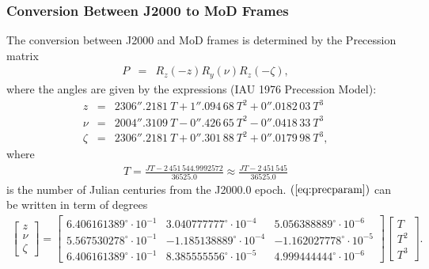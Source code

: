 \documentclass [12pt, a4paper] {article}
\begin{document}
\subsubsection{Conversion Between J2000 to MoD Frames}
The conversion between J2000 and MoD frames is determined by the Precession matrix
\begin {eqnarray}
  P &=& R_z(-z)R_y(\nu)R_z(-\zeta),
\end {eqnarray}
where the angles are given by the expressions (IAU 1976 Precession Model):
\begin {eqnarray}
  \label{eq:precparam}
  z     &=& 2306''.2181\:T + 1''.094\,68\:T^2 + 0''.0182\,03\:T^3 \\\nonumber
  \nu   &=& 2004''.3109\:T - 0''.426\,65\:T^2 - 0''.0418\,33\:T^3 \\\nonumber
  \zeta &=& 2306''.2181\:T + 0''.301\,88\:T^2 + 0''.0179\,98\:T^3,
\end {eqnarray}
where
\begin {eqnarray}
  T= \frac{JT - 2\,451\,544.9992572}{36525.0} \approx 
  \frac{JT - 2\,451\,545}{36525.0}
\end {eqnarray} 
is the number of Julian centuries from the J2000.0 epoch.
$(\ref{eq:precparam})$ can be written in term of degrees
\begin {eqnarray}
  \begin {bmatrix}
    z\\\nu\\\zeta
  \end {bmatrix}
  =
  \begin {bmatrix}
    6.406161389^\circ\cdot 10^{-1} &  3.040777777^\circ\cdot 10^{-4} &  5.056388889^\circ\cdot 10^{-6} \\
    5.567530278^\circ\cdot 10^{-1} & -1.185138889^\circ\cdot 10^{-4} & -1.162027778^\circ\cdot 10^{-5} \\
    6.406161389^\circ\cdot 10^{-1} &  8.385555556^\circ\cdot 10^{-5} &  4.999444444^\circ\cdot 10^{-6}
  \end {bmatrix}
  \begin {bmatrix}
    T \\ T^2 \\ T^3
  \end {bmatrix}.
\end {eqnarray}
\end{document}
